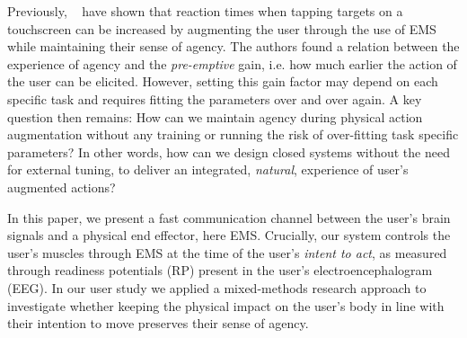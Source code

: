 Previously, ~\citet{Kasahara2019-sk} have shown that reaction times when tapping targets on a touchscreen can be increased by augmenting the user through the use of EMS while maintaining their sense of agency. The authors found a relation between the experience of agency and the \textit{pre-emptive} gain, i.e. how much earlier the action of the user can be elicited. However, setting this gain factor may depend on each specific task and requires fitting the parameters over and over again. A key question then remains: How can we maintain agency during physical action augmentation without any training or running the risk of over-fitting task specific parameters? In other words, how can we design closed systems without the need for external tuning, to deliver an integrated, \textit{natural}, experience of user's augmented actions?



In this paper, we present a fast communication channel between the user's brain signals and a physical end effector, here EMS. Crucially, our system controls the user's muscles through EMS at the time of the user's \textit{intent to act}, as measured through readiness potentials (RP) present in the user's electroencephalogram (EEG). In our user study we applied a mixed-methods research approach to investigate whether keeping the physical impact on the user's body in line with their intention to move preserves their sense of agency.

